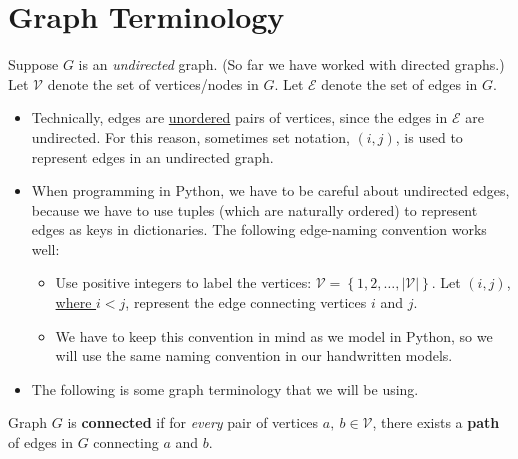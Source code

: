 \documentclass[11pt]{article}
\theoremstyle{definition}
\newcommand{\answerbox}[3]{%
  \fbox{%
    \begin{minipage}[#1]{#2}
      \hfill\vspace{#3}
    \end{minipage}
  }
}
\newcommand{\answerboxfull}[2]{%
  \answerbox{#1}{6.38in}{#2} 
}
\begin{document}
%
%
%
%
%

\newpage

\section{Graph Terminology}


Suppose $G$ is an \emph{undirected} graph. (So far we have worked with directed graphs.) Let $\mathcal{V}$ denote the set of vertices/nodes in $G$.  Let $\mathcal{E}$ denote the set of edges in $G$.  


\begin{itemize}
\item Technically, edges are \underline{unordered} pairs of vertices, since the edges in $\mathcal{E}$ are undirected. For this reason, sometimes set notation, $(i,j)$, is used to represent edges in an undirected graph.

\item When programming in Python, we have to be careful about undirected edges, because we have to use tuples (which are naturally ordered) to represent edges as keys in dictionaries. The following edge-naming convention works well:
	\begin{itemize}
		\item Use positive integers to label the vertices: $\mathcal{V} = \left\{1, 2, \dots, \left|{\mathcal{V}}\right|\right\}$.  Let $(i,j)$, \underline{where $i < j$}, represent the edge connecting vertices $i$ and $j$.  
		\item We have to keep this convention in mind as we model in Python, so we will use the same naming convention in our handwritten models.
	\end{itemize}


\item The following is some graph terminology that we will be using.
\end{itemize}

\begin{tcolorbox}
Graph $G$ is \textbf{connected} if for \emph{every} pair of vertices $a,~b \in \mathcal{V}$, there exists a \textbf{path} of edges in $G$ connecting $a$ and $b$.  
\end{tcolorbox}
\end{document}
